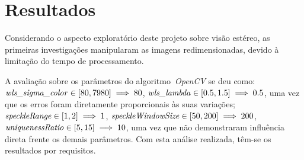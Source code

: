 \section{Resultados}
    \label{sec:result}
Considerando o aspecto exploratório deste projeto sobre visão estéreo, as primeiras investigações manipularam as imagens redimensionadas, devido à limitação do tempo de processamento.

A avaliação sobre os parâmetros do algoritmo~\emph{OpenCV} se deu como: $\text{\emph{wls\_sigma\_color}} \in [80, 7980] \implies 80$, $\text{\emph{wls\_lambda}} \in [0.5, 1.5] \implies 0.5$, uma vez que os erros foram diretamente proporcionais às suas variações; $\text{\emph{speckleRange}} \in [1, 2] \implies 1$, $\text{\emph{speckleWindowSize}} \in [50, 200] \implies 200$, $\text{\emph{uniquenessRatio}} \in [5, 15] \implies 10$, uma vez que não demonstraram influência direta frente os demais parâmetros. Com esta análise realizada, têm-se os resultados por requisitos.





